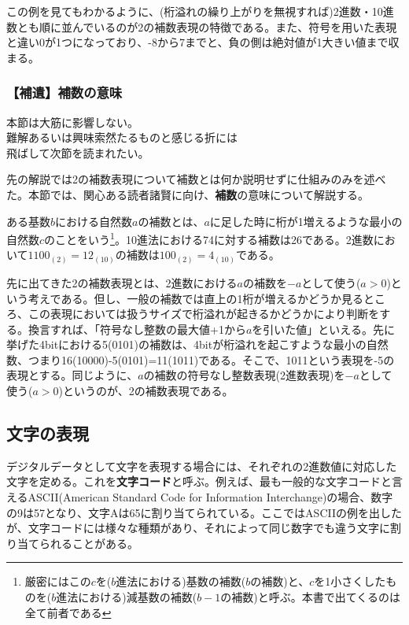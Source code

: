 この例を見てもわかるように、(桁溢れの繰り上がりを無視すれば)2進数・10進数とも順に並んでいるのが2の補数表現の特徴である。また、符号を用いた表現と違い0が1つになっており、-8から7までと、負の側は絶対値が1大きい値まで収まる。

\subsubsection{【補遺】補数の意味}
\begin{center}
\begin{minipage}[]{0.75\linewidth}
\begin{screen}
\begin{center}
本節は大筋に影響しない。\\
難解あるいは興味索然たるものと感じる折には\\
飛ばして次節を読まれたい。
\end{center}
\end{screen}
\end{minipage}
\end{center}

先の解説では2の補数表現について補数とは何か説明せずに仕組みのみを述べた。本節では、関心ある読者諸賢に向け、\textbf{補数}の意味について解説する。

ある基数$b$における自然数$a$の補数とは、$a$に足した時に桁が1増えるような最小の自然数$c$のことをいう\footnote{厳密にはこの$c$を($b$進法における)基数の補数($b$の補数)と、$c$を1小さくしたものを($b$進法における)減基数の補数($b-1$の補数)と呼ぶ。本書で出てくるのは全て前者である}。10進法における74に対する補数は26である。2進数において$1100_{(2)}=12_{(10)}$の補数は$100_{(2)}=4_{(10)}$である。

先に出てきた2の補数表現とは、2進数における$a$の補数を$-a$として使う($a>0$)という考えである。但し、一般の補数では直上の1桁が増えるかどうか見るところ、この表現においては扱うサイズで桁溢れが起きるかどうかにより判断をする。換言すれば、「符号なし整数の最大値+1から$a$を引いた値」といえる。先に挙げた4bitにおける5(0101)の補数は、4bitが桁溢れを起こすような最小の自然数、つまり16(10000)-5(0101)=11(1011)である。そこで、1011という表現を-5の表現とする。同じように、$a$の補数の符号なし整数表現(2進数表現)を$-a$として使う($a>0$)というのが、2の補数表現である。


\subsection{文字の表現}
デジタルデータとして文字を表現する場合には、それぞれの2進数値に対応した文字を定める。これを\textbf{文字コード}と呼ぶ。例えば、最も一般的な文字コードと言えるASCII(American Standard Code for Information Interchange)の場合、数字の9は57となり、文字Aは65に割り当てられている。ここではASCIIの例を出したが、文字コードには様々な種類があり、それによって同じ数字でも違う文字に割り当てられることがある。

